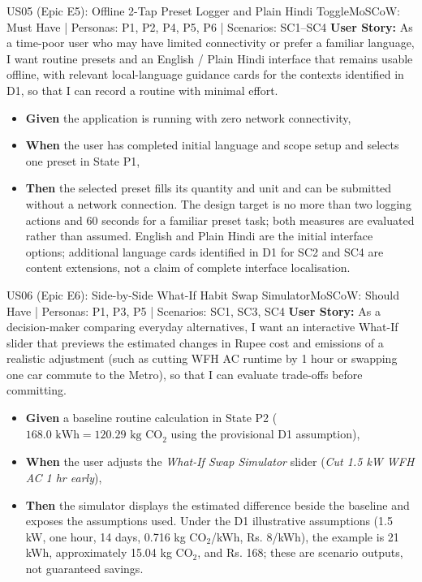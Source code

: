 \documentclass[12pt, a4paper]{article}
\begin{document}
\begin{storybox}{US05 (Epic E5): Offline 2-Tap Preset Logger and Plain Hindi Toggle}{MoSCoW: Must Have | Personas: P1, P2, P4, P5, P6 | Scenarios: SC1--SC4}
\textbf{User Story:} As a time-poor user who may have limited connectivity or prefer a familiar language, I want routine presets and an English / Plain Hindi interface that remains usable offline, with relevant local-language guidance cards for the contexts identified in D1, so that I can record a routine with minimal effort.
\begin{itemize}
    \item \textbf{Given} the application is running with zero network connectivity,
    \item \textbf{When} the user has completed initial language and scope setup and selects one preset in State P1,
    \item \textbf{Then} the selected preset fills its quantity and unit and can be submitted without a network connection. The design target is no more than two logging actions and 60 seconds for a familiar preset task; both measures are evaluated rather than assumed. English and Plain Hindi are the initial interface options; additional language cards identified in D1 for SC2 and SC4 are content extensions, not a claim of complete interface localisation.
\end{itemize}
\end{storybox}

\begin{storybox}{US06 (Epic E6): Side-by-Side What-If Habit Swap Simulator}{MoSCoW: Should Have | Personas: P1, P3, P5 | Scenarios: SC1, SC3, SC4}
\textbf{User Story:} As a decision-maker comparing everyday alternatives, I want an interactive What-If slider that previews the estimated changes in Rupee cost and emissions of a realistic adjustment (such as cutting WFH AC runtime by 1 hour or swapping one car commute to the Metro), so that I can evaluate trade-offs before committing.
\begin{itemize}
    \item \textbf{Given} a baseline routine calculation in State P2 ($168.0\text{ kWh} = 120.29\text{ kg CO}_2$ using the provisional D1 assumption),
    \item \textbf{When} the user adjusts the \textit{What-If Swap Simulator} slider (\textit{Cut 1.5 kW WFH AC 1 hr early}),
    \item \textbf{Then} the simulator displays the estimated difference beside the baseline and exposes the assumptions used. Under the D1 illustrative assumptions (1.5 kW, one hour, 14 days, 0.716 kg CO$_2$/kWh, Rs. 8/kWh), the example is 21 kWh, approximately 15.04 kg CO$_2$, and Rs. 168; these are scenario outputs, not guaranteed savings.
\end{itemize}
\end{storybox}
\end{document}
